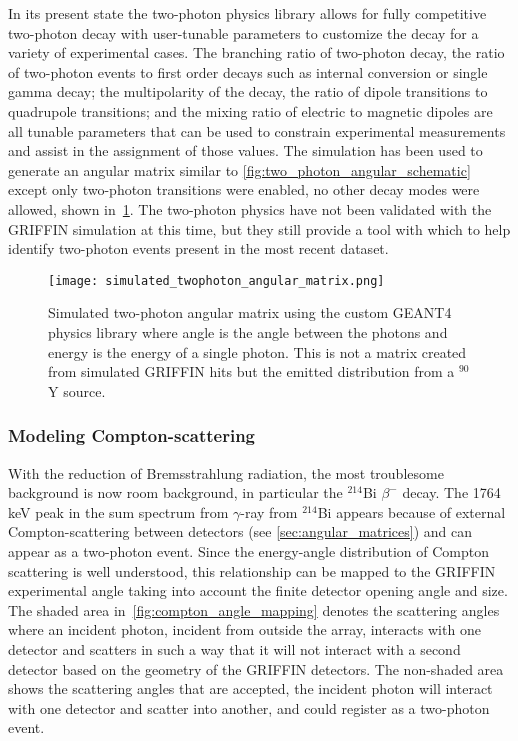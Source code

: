 \documentclass[cnatzke_thesis_proposal.tex]{subfiles}
\begin{document}
In its present state the two-photon physics library allows for fully competitive two-photon decay with user-tunable parameters to customize the decay for a variety of experimental cases.
The branching ratio of two-photon decay, the ratio of two-photon events to first order decays such as internal conversion or single gamma decay; the multipolarity of the decay, the ratio of dipole transitions to quadrupole transitions; and the mixing ratio of electric to magnetic dipoles are all tunable parameters that can be used to constrain experimental measurements and assist in the assignment of those values.
The simulation has been used to generate an angular matrix similar to \ref{fig:two_photon_angular_schematic} except only two-photon transitions were enabled, no other decay modes were allowed, shown in~\ref{fig:simulated_twophoton_angular_matrix}.
The two-photon physics have not been validated with the GRIFFIN simulation at this time, but they still provide a tool with which to help identify two-photon events present in the most recent dataset.

\begin{figure}[htbp]
  \centering
  \texttt{[image: simulated\_twophoton\_angular\_matrix.png]}
  \caption{Simulated two-photon angular matrix using the custom GEANT4 physics library where angle is the angle between the photons and energy is the energy of a single photon. This is not a matrix created from simulated GRIFFIN hits but the emitted distribution from a $^{90}$Y source.}
  \label{fig:simulated_twophoton_angular_matrix}
\end{figure}

\subsubsection{Modeling Compton-scattering}
\label{sec:compton_scatter}
With the reduction of Bremsstrahlung radiation, the most troublesome background is now room background, in particular the $^{214}$Bi $\beta^-$ decay.
The 1764 keV peak in the sum spectrum from $\gamma$-ray from $^{214}$Bi appears because of external Compton-scattering between detectors (see \ref{sec:angular_matrices}) and can appear as a two-photon event.
Since the energy-angle distribution of Compton scattering is well understood, this relationship can be mapped to the GRIFFIN experimental angle taking into account the finite detector opening angle and size.
The shaded area in~\ref{fig:compton_angle_mapping} denotes the scattering angles where an incident photon, incident from outside the array, interacts with one detector and scatters in such a way that it will not interact with a second detector based on the geometry of the GRIFFIN detectors. 
The non-shaded area shows the scattering angles that are accepted, the incident photon will interact with one detector and scatter into another, and could register as a two-photon event.
\end{document}
